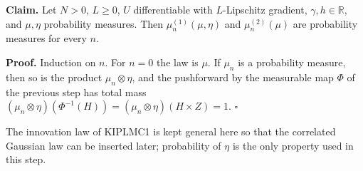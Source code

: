 \documentclass[11pt,a4paper]{article}
\begin{document}
\textbf{Claim.} Let \(N>0\), \(L\ge0\), \(U\) differentiable with \(L\)-Lipschitz gradient, \(\gamma,h\in\mathbb R\), and \(\mu,\eta\) probability measures. Then \(\mu^{(1)}_n(\mu,\eta)\) and \(\mu^{(2)}_n(\mu)\) are probability measures for every \(n\).




\textbf{Proof.} Induction on \(n\). For \(n=0\) the law is \(\mu\). If \(\mu_n\) is a probability measure, then so is the product \(\mu_n\otimes\eta\), and the pushforward by the measurable map \(\Phi\) of the previous step has total mass \((\mu_n\otimes\eta)(\Phi^{-1}(H))=(\mu_n\otimes\eta)(H\times Z)=1\). \(\square\)




The innovation law of KIPLMC1 is kept general here so that the correlated Gaussian law can be inserted later; probability of \(\eta\) is the only property used in this step.
\end{document}
